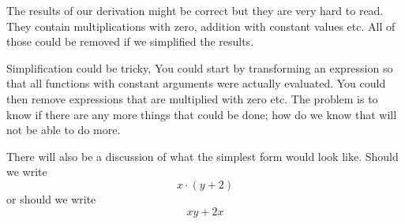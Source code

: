 \documentclass[a4paper,11pt]{article}
\begin{document}
The results of our derivation might be correct but they are very hard
to read. They contain multiplications with zero, addition with
constant values etc. All of those could be removed if we simplified the results.

Simplification could be tricky, You could start by transforming an
expression so that all functions with constant arguments were actually
evaluated. You could then remove expressions that are multiplied with
zero etc. The problem is to know if there are any more things that
could be done; how do we know that will not be able to do more.

There will also be a discussion of what the simplest form would look
like. Should we write $$ x \cdot (y + 2)$$ or should we write
$$xy + 2x$$
\end{document}
